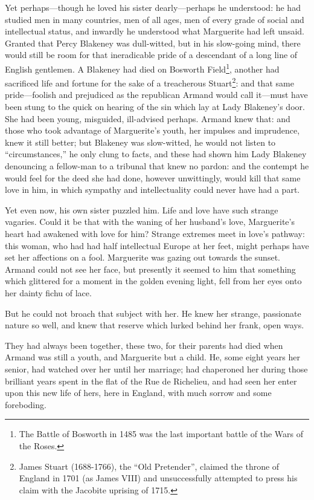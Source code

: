 \documentclass[paper=5.5in:8.5in,BCOR=7mm,twoside,DIV=calc,12pt,usegeometry,chapterprefix,endperiod,headings=big]{scrbook}
\begin{document}
Yet perhaps---though he loved his sister dearly---perhaps he understood: he had studied men in many countries, men of all ages, men of every grade of social and intellectual status, and inwardly he understood what Marguerite had left unsaid. Granted that Percy Blakeney was dull-witted, but in his slow-going mind, there would still be room for that ineradicable pride of a descendant of a long line of English gentlemen. A Blakeney had died on Bosworth Field\footnote{The Battle of Bosworth in 1485 was the last important battle of the Wars of the Roses.}, another had sacrificed life and fortune for the sake of a treacherous Stuart\footnote{James Stuart (1688-1766), the \enquote{Old Pretender}, claimed the throne of England in 1701 (as James VIII) and unsuccessfully attempted to press his claim with the Jacobite uprising of 1715.}: and that same pride---foolish and prejudiced as the republican Armand would call it---must have been stung to the quick on hearing of the sin which lay at Lady Blakeney's door. She had been young, misguided, ill-advised perhaps. Armand knew that: and those who took advantage of Marguerite's youth, her impulses and imprudence, knew it still better; but Blakeney was slow-witted, he would not listen to \enquote{circumstances,} he only clung to facts, and these had shown him Lady Blakeney denouncing a fellow-man to a tribunal that knew no pardon: and the contempt he would feel for the deed she had done, however unwittingly, would kill that same love in him, in which sympathy and intellectuality could never have had a part.

Yet even now, his own sister puzzled him. Life and love have such strange vagaries. Could it be that with the waning of her husband's love, Marguerite's heart had awakened with love for him? Strange extremes meet in love's pathway: this woman, who had had half intellectual Europe at her feet, might perhaps have set her affections on a fool. Marguerite was gazing out towards the sunset. Armand could not see her face, but presently it seemed to him that something which glittered for a moment in the golden evening light, fell from her eyes onto her dainty fichu of lace.

But he could not broach that subject with her. He knew her strange, passionate nature so well, and knew that reserve which lurked behind her frank, open ways.

They had always been together, these two, for their parents had died when Armand was still a youth, and Marguerite but a child. He, some eight years her senior, had watched over her until her marriage; had chaperoned her during those brilliant years spent in the flat of the Rue de Richelieu, and had seen her enter upon this new life of hers, here in England, with much sorrow and some foreboding.
\end{document}
